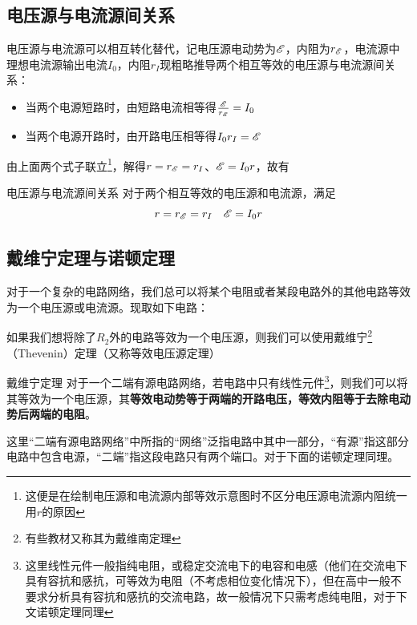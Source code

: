 \subsection{电压源与电流源间关系}
\label{dyydlygx}

电压源与电流源可以相互转化替代，记电压源电动势为$\mathscr{E}$，内阻为$r_{\mathscr{E}}$，电流源中理想电流源输出电流$I_0$，内阻$r_I$现粗略推导两个相互等效的电压源与电流源间关系：

\begin{itemize}
\item 当两个电源短路时，由短路电流相等得$\frac{\mathscr{E}}{r_{\mathscr{E}}} = I_0$
\item 当两个电源开路时，由开路电压相等得$I_0 r_I = \mathscr{E}$
\end{itemize}

由上面两个式子联立\footnote{这便是在绘制电压源和电流源内部等效示意图时不区分电压源电流源内阻统一用$r$的原因}，解得$r = r_{\mathscr{E}} = r_{I}$、$\mathscr{E} = I_0 r $，故有

\begin{theo}{电压源与电流源间关系}{}
对于两个相互等效的电压源和电流源，满足
$$r = r_{\mathscr{E}} = r_{I} \quad \mathscr{E} = I_0 r$$
\end{theo}

\subsection{戴维宁定理与诺顿定理}

对于一个复杂的电路网络，我们总可以将某个电阻或者某段电路外的其他电路等效为一个电压源或电流源。现取如下电路：



如果我们想将除了$R_2$外的电路等效为一个电压源，则我们可以使用戴维宁\footnote{有些教材又称其为戴维南定理}（Thevenin）定理（又称等效电压源定理）

\begin{theo}[label=dwndl]{戴维宁定理}{}
对于一个二端有源电路网络，若电路中只有线性元件\footnote{这里线性元件一般指纯电阻，或稳定交流电下的电容和电感（他们在交流电下具有容抗和感抗，可等效为电阻（不考虑相位变化情况下），但在高中一般不要求分析具有容抗和感抗的交流电路，故一般情况下只需考虑纯电阻，对于下文诺顿定理同理}，则我们可以将其等效为一个电压源，其\textbf{等效电动势等于两端的开路电压，等效内阻等于去除电动势后两端的电阻}。

这里“二端有源电路网络”中所指的“网络”泛指电路中其中一部分，“有源”指这部分电路中包含电源，“二端”指这段电路只有两个端口。对于下面的诺顿定理同理。
\end{theo}

